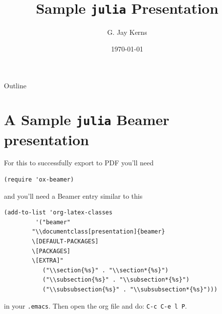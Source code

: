\documentclass[presentation]{beamer}
\institute{The Really Great Institute \\ Somewhere On, Earth}
\author{G. Jay Kerns}
\date{\today}
\title{Sample \texttt{julia} Presentation}
\begin{document}
\maketitle
\begin{frame}{Outline}
\tableofcontents
\end{frame}


\section[A Sample \texttt{julia} Beamer presentation]{A Sample \texttt{julia} Beamer presentation}
\label{sec-1}

\begin{frame}[fragile,label=sec-1-1]{}
 For this to successfully export to PDF you'll need

\begin{verbatim}
(require 'ox-beamer)
\end{verbatim}

and you'll need a Beamer entry similar to this

\begin{verbatim}
(add-to-list 'org-latex-classes
	     '("beamer"
        "\\documentclass[presentation]{beamer}
        \[DEFAULT-PACKAGES]
        \[PACKAGES]
        \[EXTRA]"
	       ("\\section{%s}" . "\\section*{%s}")
	       ("\\subsection{%s}" . "\\subsection*{%s}")
	       ("\\subsubsection{%s}" . "\\subsubsection*{%s}")))
\end{verbatim}

in your \texttt{.emacs}. Then open the org file and do: \texttt{C-c C-e l P}.
\end{frame}
\end{document}
